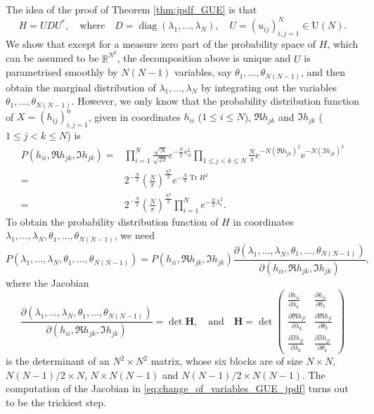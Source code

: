 \documentclass[11pt, a4paper]{article}
\numberwithin{equation}{section}
\newcommand{\realR}{\mathbb{R}}
\newcommand{\Unitary}{\mathrm{U}}
\renewcommand{\vec}[1]{\mathbf{#1}}
\DeclareMathOperator{\diag}{diag}
\DeclareMathOperator{\Tr}{Tr}
\theoremstyle{definition}
\theoremstyle{remark}
\begin{document}
The idea of the proof of Theorem \ref{thm:jpdf_GUE} is that
\begin{equation} \label{eq:decomp_of_Hermitian}
  H = U D U^*, \quad \text{where} \quad D = \diag(\lambda_1, \dotsc, \lambda_N), \quad U = (u_{ij})^N_{i, j = 1} \in \Unitary(N).
\end{equation}
We show that except for a measure zero part of the probability space of $H$, which can be assumed to be $\realR^{N^2}$, the decomposition above is unique and $U$ is parametrised smoothly by $N(N - 1)$ variables, say $\theta_1, \dotsc, \theta_{N(N - 1)}$, and then obtain the marginal distribution of $\lambda_1, \dots, \lambda_N$ by integrating out the variables $\theta_1, \dotsc, \theta_{N(N - 1)}$. However, we only know that the probability distribution function of $X = (h_{ij})^n_{i, j = 1}$, given in coordinates $h_{ii}$ ($1 \leq i \leq N$), $\Re h_{jk}$ and $\Im h_{jk}$ ($1 \leq j < k \leq N$) is
\begin{equation} \label{eq:density_of_GUE}
  \begin{split}
    P(h_{ii}, \Re h_{jk}, \Im h_{jk}) = {}& \prod^N_{i = 1} \frac{\sqrt{N}}{\sqrt{2\pi}} e^{-\frac{N}{2} x^2_{ii}} \prod_{1 \leq j < k \leq N} \frac{N}{\pi} e^{-N (\Re h_{jk})^2} e^{-N (\Im h_{jk})^2} \\
    = {}& 2^{-\frac{N}{2}} \left( \frac{N}{\pi} \right)^{\frac{N^2}{2}} e^{-\frac{N}{2} \Tr H^2} \\
    = {}& 2^{-\frac{N}{2}} \left( \frac{N}{\pi} \right)^{\frac{N^2}{2}} \prod^N_{i = 1} e^{-\frac{N}{2} \lambda^2_i}.
  \end{split}
\end{equation}
To obtain the probability distribution function of $H$ in coordinates $\lambda_1, \dotsc, \lambda_N, \theta_1, \dotsc, \theta_{N(N - 1)}$, we need
\begin{equation} \label{eq:change_of_variables_GUE_jpdf}
  P(\lambda_1, \dotsc, \lambda_N, \theta_1, \dotsc, \theta_{N(N - 1)}) = P(h_{ii}, \Re h_{jk}, \Im h_{jk}) \frac{\partial(\lambda_1, \dotsc, \lambda_N, \theta_1, \dotsc, \theta_{N(N - 1)})}{\partial(h_{ii}, \Re h_{jk}, \Im h_{jk})},
\end{equation}
where the Jacobian
\begin{equation} \label{eq:formula_of_Jacobian}
  \frac{\partial(\lambda_1, \dotsc, \lambda_N, \theta_1, \dotsc, \theta_{N(N - 1)})}{\partial(h_{ii}, \Re h_{jk}, \Im h_{jk})} = \det{\vec{H}}, \quad \text{and} \quad \vec{H} = \det
  \begin{pmatrix}
    \frac{\partial h_{ii}}{\partial \lambda_k} & \frac{\partial h_{ii}}{\partial \theta_k} \\
    \frac{\partial \Re h_{jl}}{\partial \lambda_k} & \frac{\partial \Re h_{jl}}{\partial \theta_k} \\
    \frac{\partial \Im h_{jl}}{\partial \lambda_k} & \frac{\partial \Im h_{jl}}{\partial \theta_k}
  \end{pmatrix}
\end{equation}
is the determinant of an $N^2 \times N^2$ matrix, whose six blocks are of size $N \times N$, $N(N - 1)/2 \times N$, $N \times N(N - 1)$ and $N(N - 1)/2 \times N(N - 1)$. The computation of the Jacobian in \eqref{eq:change_of_variables_GUE_jpdf} turns out to be the trickiest step.
\end{document}
